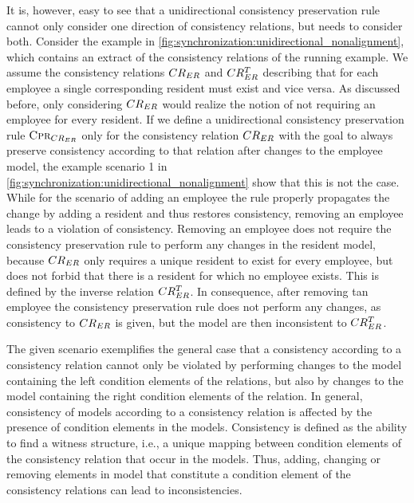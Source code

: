 It is, however, easy to see that a unidirectional consistency preservation rule cannot only consider one direction of consistency relations, but needs to consider both.
Consider the example in \autoref{fig:synchronization:unidirectional_nonalignment}, which contains an extract of the consistency relations of the running example.
We assume the consistency relations $CR_{ER}$ and $CR_{ER}^T$ describing that for each employee a single corresponding resident must exist and vice versa.
As discussed before, only considering $CR_{ER}$ would realize the notion of not requiring an employee for every resident.
If we define a unidirectional consistency preservation rule $\textsc{Cpr}_{CR_{ER}}$ only for the consistency relation $CR_{ER}$ with the goal to always preserve consistency according to that relation after changes to the employee model, the example scenario 1 in \autoref{fig:synchronization:unidirectional_nonalignment} show that this is not the case.
While for the scenario of adding an employee the rule properly propagates the change by adding a resident and thus restores consistency, removing an employee leads to a violation of consistency.
Removing an employee does not require the consistency preservation rule to perform any changes in the resident model, because $CR_{ER}$ only requires a unique resident to exist for every employee, but does not forbid that there is a resident for which no employee exists.
This is defined by the inverse relation $CR_{ER}^T$.
In consequence, after removing tan employee the consistency preservation rule does not perform any changes, as consistency to $CR_{ER}$ is given, but the model are then inconsistent to $CR_{ER}^T$.

The given scenario exemplifies the general case that a consistency according to a consistency relation cannot only be violated by performing changes to the model containing the left condition elements of the relations, but also by changes to the model containing the right condition elements of the relation.
In general, consistency of models according to a consistency relation is affected by the presence of condition elements in the models.
Consistency is defined as the ability to find a witness structure, i.e., a unique mapping between condition elements of the consistency relation that occur in the models.
Thus, adding, changing or removing elements in model that constitute a condition element of the consistency relations can lead to inconsistencies.

